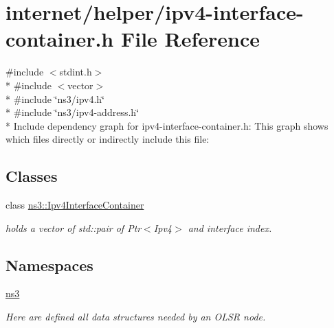 \hypertarget{ipv4-interface-container_8h}{}\section{internet/helper/ipv4-\/interface-\/container.h File Reference}
\label{ipv4-interface-container_8h}
{\ttfamily \#include $<$stdint.\+h$>$}\\*
{\ttfamily \#include $<$vector$>$}\\*
{\ttfamily \#include \char`\"{}ns3/ipv4.\+h\char`\"{}}\\*
{\ttfamily \#include \char`\"{}ns3/ipv4-\/address.\+h\char`\"{}}\\*
Include dependency graph for ipv4-\/interface-\/container.h\+:
This graph shows which files directly or indirectly include this file\+:
\subsection*{Classes}
\begin{DoxyCompactItemize}
\item 
class \hyperlink{classns3_1_1Ipv4InterfaceContainer}{ns3\+::\+Ipv4\+Interface\+Container}
\begin{DoxyCompactList}\small\item\em holds a vector of std\+::pair of Ptr$<$\+Ipv4$>$ and interface index. \end{DoxyCompactList}\end{DoxyCompactItemize}
\subsection*{Namespaces}
\begin{DoxyCompactItemize}
\item 
 \hyperlink{namespacens3}{ns3}
\begin{DoxyCompactList}\small\item\em Here are defined all data structures needed by an O\+L\+SR node. \end{DoxyCompactList}\end{DoxyCompactItemize}
